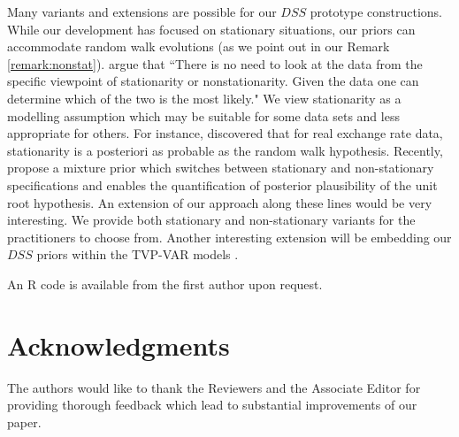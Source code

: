 \documentclass[ba]{imsart}
\numberwithin{equation}{section}
\theoremstyle{plain}
\begin{document}
{{
Many variants and extensions are possible for our $DSS$ prototype constructions. While our development has focused on stationary situations,  our priors can accommodate random walk evolutions (as we point out in our Remark \ref{remark:nonstat}). 
\cite{schotman} argue that  ``There is no need to look at the data from the specific viewpoint of stationarity or nonstationarity. Given the data one can determine which of the two is the most likely." We view stationarity as a modelling assumption which may be suitable for some data sets and less appropriate for others. For instance, \cite{schotman} discovered that for real exchange rate data, stationarity is a posteriori as probable as the random walk hypothesis. 
Recently,  \cite{lopes_mcc_tsay} propose a mixture prior which switches between stationary and non-stationary specifications and enables the quantification of  posterior plausibility of the unit root hypothesis.   An extension of our approach along these lines would be very interesting. We provide both stationary and non-stationary variants for the practitioners to choose from. Another interesting extension will be embedding our $DSS$ priors within the TVP-VAR models  \citep{Cogley2005,Primiceri2005,lopes_mcc_tsay,nakajima_west,
pettenuzzo2016bayesian,gefang2014bayesian,giannone2014short,korobilis2013var,banbura2010large}.


}




An R code is available  from the first author upon request.

\section*{Acknowledgments}
The authors would like to thank the Reviewers and the Associate Editor for providing thorough feedback which lead to substantial improvements of our paper.}
\end{document}
